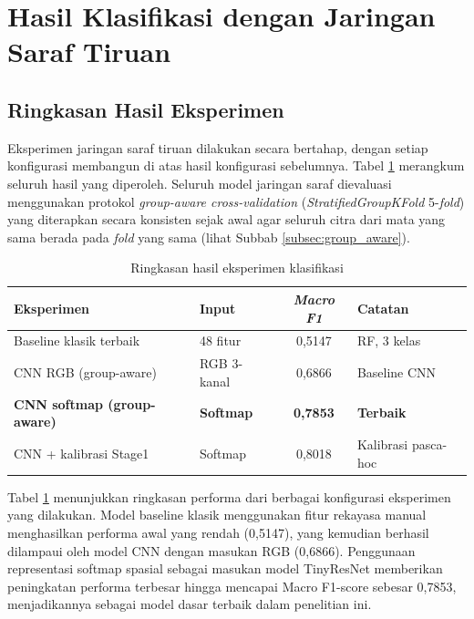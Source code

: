 \section{Hasil Klasifikasi dengan Jaringan Saraf Tiruan}

\subsection{Ringkasan Hasil Eksperimen}

Eksperimen jaringan saraf tiruan dilakukan secara bertahap, dengan setiap konfigurasi
membangun di atas hasil konfigurasi sebelumnya. Tabel \ref{tab:hasil_keseluruhan} merangkum
seluruh hasil yang diperoleh. Seluruh model jaringan saraf dievaluasi menggunakan protokol
\textit{group-aware cross-validation} (\textit{StratifiedGroupKFold} 5-\textit{fold}) yang
diterapkan secara konsisten sejak awal agar seluruh citra dari mata yang sama berada pada
\textit{fold} yang sama (lihat Subbab \ref{subsec:group_aware}).

\begin{table}[H]
\centering
\caption{Ringkasan hasil eksperimen klasifikasi}
\label{tab:hasil_keseluruhan}
\begin{tabular}{l l c l}
\toprule
\textbf{Eksperimen} & \textbf{Input} & \textbf{\textit{Macro F1}} & \textbf{Catatan} \\
\midrule
Baseline klasik terbaik     & 48 fitur    & 0,5147 & RF, 3 kelas \\
CNN RGB (group-aware)       & RGB 3-kanal & 0,6866 & Baseline CNN \\
\textbf{CNN softmap (group-aware)} & \textbf{Softmap} & \textbf{0,7853} & \textbf{Terbaik} \\
CNN + kalibrasi Stage1      & Softmap     & 0,8018 & Kalibrasi pasca-hoc \\
\bottomrule
\end{tabular}
\end{table}

Tabel \ref{tab:hasil_keseluruhan} menunjukkan ringkasan performa dari berbagai konfigurasi eksperimen yang dilakukan. Model baseline klasik menggunakan fitur rekayasa manual menghasilkan performa awal yang rendah (0,5147), yang kemudian berhasil dilampaui oleh model CNN dengan masukan RGB (0,6866). Penggunaan representasi softmap spasial sebagai masukan model TinyResNet memberikan peningkatan performa terbesar hingga mencapai Macro F1-score sebesar 0,7853, menjadikannya sebagai model dasar terbaik dalam penelitian ini.

